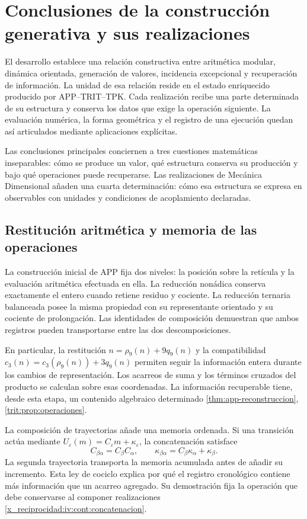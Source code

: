 \chapter{Conclusiones de la construcción generativa y sus realizaciones}
\label{hmt:sistematica:conclusiones}

El desarrollo establece una relación constructiva entre aritmética
modular, dinámica orientada, generación de valores, incidencia
excepcional y recuperación de información. La unidad de esa relación
reside en el estado enriquecido producido por APP--TRIT--TPK. Cada
realización recibe una parte determinada de su estructura y conserva
los datos que exige la operación siguiente. La evaluación numérica,
la forma geométrica y el registro de una ejecución quedan así
articulados mediante aplicaciones explícitas.

Las conclusiones principales conciernen a tres cuestiones matemáticas
inseparables: cómo se produce un valor, qué estructura conserva su
producción y bajo qué operaciones puede recuperarse. Las realizaciones
de Mecánica Dimensional añaden una cuarta determinación: cómo esa
estructura se expresa en observables con unidades y condiciones de
acoplamiento declaradas.

\section{Restitución aritmética y memoria de las operaciones}

La construcción inicial de APP fija dos niveles: la posición sobre
la retícula y la evaluación aritmética efectuada en ella. La reducción
nonádica conserva exactamente el entero cuando retiene residuo y
cociente. La reducción ternaria balanceada posee la misma propiedad
con su representante orientado y su cociente de prolongación. Las
identidades de composición demuestran que ambos registros pueden
transportarse entre las dos descomposiciones.

En particular, la restitución
\(n=\rho_9(n)+9q_9(n)\) y la compatibilidad
\(c_3(n)=c_3(\rho_9(n))+3q_9(n)\) permiten seguir la información
entera durante los cambios de representación. Los acarreos de suma
y los términos cruzados del producto se calculan sobre esas
coordenadas. La información recuperable tiene, desde esta etapa,
un contenido algebraico determinado
\ref{thm:app-reconstruccion}, \ref{trit:prop:operaciones}.

La composición de trayectorias añade una memoria ordenada. Si una
transición actúa mediante \(U_\varepsilon(m)=C_\varepsilon m+
\kappa_\varepsilon\), la concatenación satisface
\[
 C_{\beta\alpha}=C_\beta C_\alpha,
 \qquad
 \kappa_{\beta\alpha}=C_\beta\kappa_\alpha+
 \kappa_\beta.
\]
La segunda trayectoria transporta la memoria acumulada antes de
añadir su incremento. Esta ley de cociclo explica por qué el
registro cronológico contiene más información que un acarreo
agregado. Su demostración fija la operación que debe conservarse
al componer realizaciones
\ref{x_reciprocidad:iv:cont:concatenacion}.

